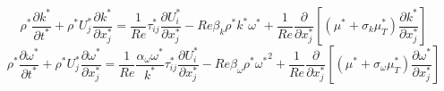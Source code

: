 %
\begin{equation}
\rho^* \frac{\partial k^*}{\partial t^*} + \rho^* U^*_j \frac{\partial k^*}{\partial x^*_j}
=
\frac{1}{Re} \tau^*_{ij} \frac{\partial U^*_i}{\partial x^*_j}
- Re \beta_k \rho^* k^* \omega^*
+ \frac{1}{Re} \frac{\partial}{\partial x^*_j} \left[
	\left( \mu^* + \sigma_k \mu_T^* \right) \frac{\partial k^*}{\partial x^*_j}
	\right]
\end{equation}
%
\begin{equation}
\rho^* \frac{\partial \omega^*}{\partial t^*} + \rho^* U^*_j \frac{\partial \omega^*}{\partial x^*_j}
=
\frac{1}{Re} \frac{\alpha_\omega \omega^*}{k^*} \tau^*_{ij} \frac{\partial U^*_i}{\partial x^*_j}
- Re \beta_\omega \rho^* {\omega^*}^2
+ \frac{1}{Re} \frac{\partial}{\partial x^*_j} \left[
	\left( \mu^* + \sigma_\omega \mu_T^* \right) \frac{\partial \omega^*}{\partial x^*_j}
	\right]
\end{equation}

